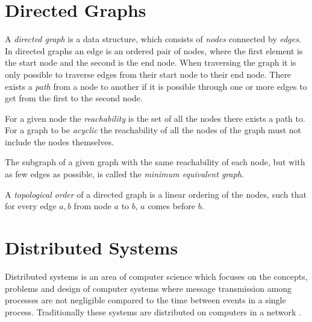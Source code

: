 	
			
	\section{Directed Graphs}
	A \textit{directed graph} is a data structure, which consists of \textit{nodes} connected by \textit{edges}. In directed graphs an edge is an ordered pair of nodes, where the first element is the start node and the second is the end node. When traversing the graph it is only possible to traverse edges from their start node to their end node. There exists a \textit{path} from a node to another if it is possible through one or more edges to get from the first to the second node.
	
	For a given node the \textit{reachability} is the set of all the nodes there exists a path to. For a graph to be \textit{acyclic} the reachability of all the nodes of the graph must not include the nodes themselves. 
	
	The subgraph of a given graph with the same reachability of each node, but with as few edges as possible, is called the \textit{minimum equivalent graph}.
	
	A \textit{topological order} of a directed graph is a linear ordering of the nodes, such that for every edge $a,b$ from node $a$ to $b$, $a$ comes before $b$.
	

	\section{Distributed Systems}
		Distributed systems is an area of computer science which focuses on the concepts, problems and design of computer systems where message transmission among processes are not negligible compared to the time between events in a single process. Traditionally these systems are distributed on computers in a network \cite{Coulouris:2011:DSC:2029110}. 
		

